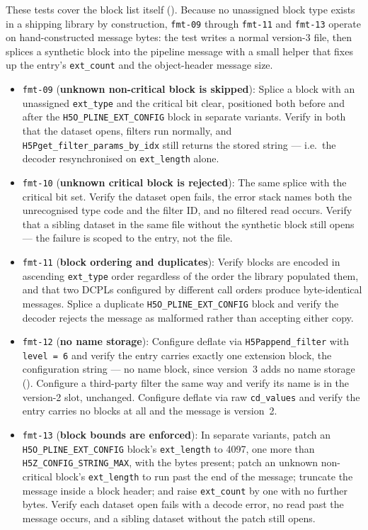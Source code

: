 \documentclass[../RFC-HDFG-2026-001.tex]{subfiles}
\begin{document}

These tests cover the block list itself
().  Because no unassigned block type
exists in a shipping library by construction, \texttt{fmt-09} through
\texttt{fmt-11} and \texttt{fmt-13} operate on hand-constructed message bytes: the test
writes a normal version-3 file, then splices a synthetic block into the
pipeline message with a small helper that fixes up the entry's
\texttt{ext\_count} and the object-header message size.

\begin{itemize}
\item \texttt{fmt-09} (\textbf{unknown non-critical block is skipped}):
  Splice a block with an unassigned \texttt{ext\_type} and the critical
  bit clear, positioned both before and after the
  \texttt{H5O\_PLINE\_EXT\_CONFIG} block in separate variants.  Verify in
  both that the dataset opens, filters run normally, and
  \texttt{H5Pget\_filter\_params\_by\_idx} still returns the stored
  string --- i.e.\ the decoder resynchronised on \texttt{ext\_length}
  alone.
\item \texttt{fmt-10} (\textbf{unknown critical block is rejected}): The
  same splice with the critical bit set.  Verify the dataset open fails,
  the error stack names both the unrecognised type code and the filter
  ID, and no filtered read occurs.  Verify that a sibling dataset in the
  same file without the synthetic block still opens --- the failure is
  scoped to the entry, not the file.
\item \texttt{fmt-11} (\textbf{block ordering and duplicates}): Verify
  blocks are encoded in ascending \texttt{ext\_type} order regardless of
  the order the library populated them, and that two DCPLs configured by
  different call orders produce byte-identical messages.  Splice a
  duplicate \texttt{H5O\_PLINE\_EXT\_CONFIG} block and verify the decoder
  rejects the message as malformed rather than accepting either copy.
\item \texttt{fmt-12} (\textbf{no name storage}): Configure deflate via
  \texttt{H5Pappend\_filter} with \texttt{level = 6} and verify the entry
  carries exactly one extension block, the configuration string --- no
  name block, since version~3 adds no name storage
  ().  Configure a third-party
  filter the same way and verify its name is in the version-2 slot,
  unchanged.  Configure deflate via raw \texttt{cd\_values} and verify
  the entry carries no blocks at all and the message is version~2.
\item \texttt{fmt-13} (\textbf{block bounds are enforced}): In separate
  variants, patch an \texttt{H5O\_PLINE\_EXT\_CONFIG} block's
  \texttt{ext\_length} to 4097, one more than
  \texttt{H5Z\_CONFIG\_STRING\_MAX}, with the bytes present; patch an
  unknown non-critical block's \texttt{ext\_length} to run past the end of
  the message; truncate the message inside a block header; and raise
  \texttt{ext\_count} by one with no further bytes.  Verify each dataset
  open fails with a decode error, no read past the message occurs, and a
  sibling dataset without the patch still opens.
\end{itemize}
\end{document}
